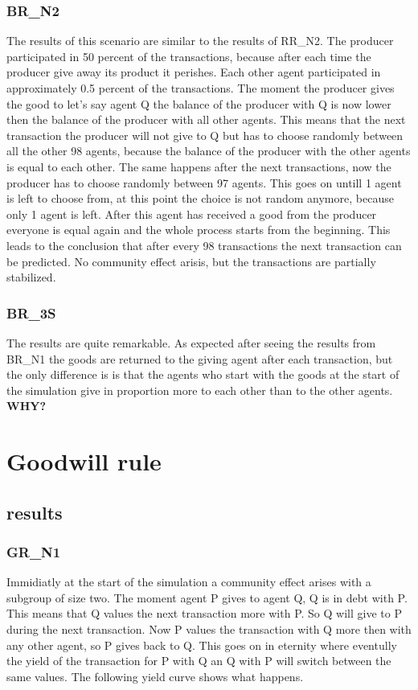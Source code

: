 \documentclass[twoside,openright]{uva-bachelor-thesis}
\begin{document}
\subsubsection{BR\_N2}
The results of this scenario are similar to the results of RR\_N2. The producer participated in 50 percent of the transactions, because after each time the producer give away its product it perishes. Each other agent participated in approximately 0.5 percent of the transactions. The moment the producer gives the good to let's say agent Q the balance of the producer with Q is now lower then the balance of the producer with all other agents. This means that the next transaction the producer will not give to Q but has to choose randomly between all the other 98 agents, because the balance of the producer with the other agents is equal to each other. The same happens after the next transactions, now the producer has to choose randomly between 97 agents. This goes on untill 1 agent is left to choose from, at this point the choice is not random anymore, because only 1 agent is left. After this agent has received a good from the producer everyone is equal again and the whole process starts from the beginning. This leads to the conclusion that after every 98 transactions the next transaction can be predicted.  No community effect arisis, but the transactions are partially stabilized.

\subsubsection{BR\_3S}
The results are quite remarkable. As expected after seeing the results from BR\_N1 the goods are returned to the giving agent after each transaction, but the only difference is is that the agents who start with the goods at the start of the simulation give in proportion more to each other than to the other agents. \textbf{WHY?}

\section{Goodwill rule}

\subsection{results}

\subsubsection{GR\_N1}
Immidiatly at the start of the simulation a community effect arises with a subgroup of size two. The moment agent P gives to agent Q, Q is in debt with P. This means that Q values the next transaction more with P. So Q will give to P during the next transaction. Now P values the transaction with Q more then with any other agent, so P gives back to Q. This goes on in eternity where eventully the yield of the transaction for P with Q an Q with P will switch between the same values. The following yield curve shows what happens. 
\end{document}
